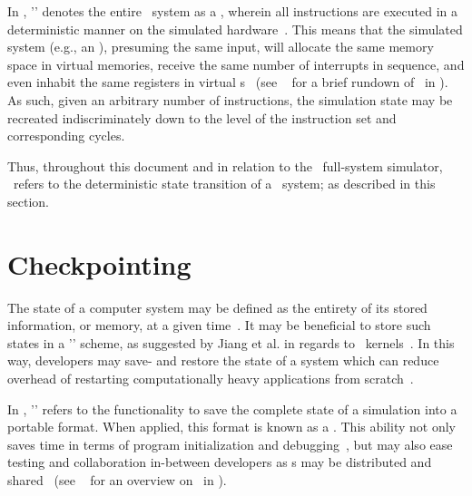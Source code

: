 In \dvttermsimics , '\dvttermdeterministicexecution ' denotes the entire \dvttermtarget\ system as a \dvttermdeterministicalgorithm , wherein all instructions are executed in a deterministic manner on the simulated hardware~.
This means that the simulated system (e.g., an \dvttermos ), presuming the same input, will allocate the same memory space in virtual memories, receive the same number of interrupts in sequence, and even inhabit the same registers in virtual \dvttermcpu s~ (see ~ for a brief rundown of \dvttermdeterministicexecution\ in \dvttermsimics ).
As such, given an arbitrary number of instructions, the simulation state may be recreated indiscriminately down to the level of the instruction set and corresponding cycles.

Thus, throughout this document and in relation to the \dvttermsimics\ full-system simulator, \dvttermdeterministicexecution\ refers to the deterministic state transition of a \dvttermtarget\ system; as described in this section.

\section{Checkpointing}
\label{sec:background_checkpointing}
The state of a computer system may be defined as the entirety of its stored information, or memory, at a given time~.
It may be beneficial to store such states in a '\dvttermcheckpointrestart ' scheme, as suggested by Jiang et al. in regards to \dvttermcuda\ kernels~.
In this way, developers may save- and restore the state of a system which can reduce overhead of restarting computationally heavy applications from scratch~.

In \dvttermsimics , '\dvttermcheckpointing ' refers to the functionality to save the complete state of a simulation into a portable format.
When applied, this format is known as a \dvttermcheckpoint .
This ability not only  saves time in terms of program initialization and debugging~, but may also ease testing and collaboration in-between developers as \dvttermcheckpoint s may be distributed and shared~ (see ~ for an overview on \dvttermcheckpointing\ in \dvttermsimics ).

